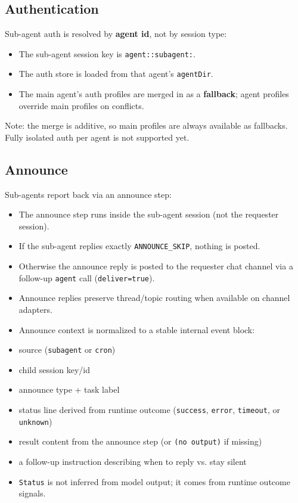 \subsection{Authentication}


Sub-agent auth is resolved by \textbf{agent id}, not by session type:

\begin{itemize}
  \item The sub-agent session key is \texttt{agent::subagent:}.
  \item The auth store is loaded from that agent's \texttt{agentDir}.
  \item The main agent's auth profiles are merged in as a \textbf{fallback}; agent profiles override main profiles on conflicts.
\end{itemize}


Note: the merge is additive, so main profiles are always available as fallbacks. Fully isolated auth per agent is not supported yet.

\subsection{Announce}


Sub-agents report back via an announce step:

\begin{itemize}
  \item The announce step runs inside the sub-agent session (not the requester session).
  \item If the sub-agent replies exactly \texttt{ANNOUNCE\_SKIP}, nothing is posted.
  \item Otherwise the announce reply is posted to the requester chat channel via a follow-up \texttt{agent} call (\texttt{deliver=true}).
  \item Announce replies preserve thread/topic routing when available on channel adapters.
  \item Announce context is normalized to a stable internal event block:
  \item source (\texttt{subagent} or \texttt{cron})
  \item child session key/id
  \item announce type + task label
  \item status line derived from runtime outcome (\texttt{success}, \texttt{error}, \texttt{timeout}, or \texttt{unknown})
  \item result content from the announce step (or \texttt{(no output)} if missing)
  \item a follow-up instruction describing when to reply vs. stay silent
  \item \texttt{Status} is not inferred from model output; it comes from runtime outcome signals.
\end{itemize}


